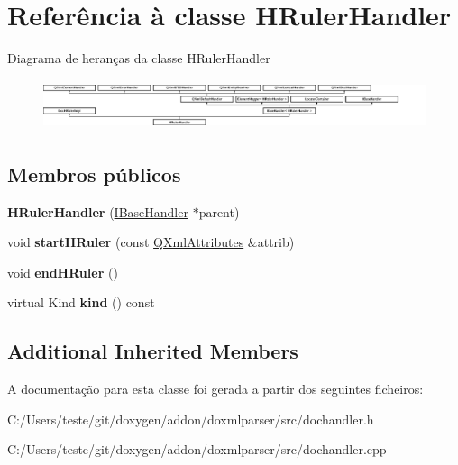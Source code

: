 \hypertarget{class_h_ruler_handler}{\section{Referência à classe H\-Ruler\-Handler}
\label{class_h_ruler_handler}
}
Diagrama de heranças da classe H\-Ruler\-Handler\begin{figure}[H]
\begin{center}
\leavevmode
\includegraphics[height=1.481482cm]{class_h_ruler_handler}
\end{center}
\end{figure}
\subsection*{Membros públicos}
\begin{DoxyCompactItemize}
\item 
\hypertarget{class_h_ruler_handler_aad7f945f51cb73f8cc76ac419ff53a85}{{\bfseries H\-Ruler\-Handler} (\hyperlink{class_i_base_handler}{I\-Base\-Handler} $\ast$parent)}\label{class_h_ruler_handler_aad7f945f51cb73f8cc76ac419ff53a85}

\item 
\hypertarget{class_h_ruler_handler_a732b339fe1cad4aad37026bf49e56139}{void {\bfseries start\-H\-Ruler} (const \hyperlink{class_q_xml_attributes}{Q\-Xml\-Attributes} \&attrib)}\label{class_h_ruler_handler_a732b339fe1cad4aad37026bf49e56139}

\item 
\hypertarget{class_h_ruler_handler_a52e19233aa8c107a9d9f544a392e2339}{void {\bfseries end\-H\-Ruler} ()}\label{class_h_ruler_handler_a52e19233aa8c107a9d9f544a392e2339}

\item 
\hypertarget{class_h_ruler_handler_af8e62c8a81ddf2283205cc8955de50eb}{virtual Kind {\bfseries kind} () const }\label{class_h_ruler_handler_af8e62c8a81ddf2283205cc8955de50eb}

\end{DoxyCompactItemize}
\subsection*{Additional Inherited Members}


A documentação para esta classe foi gerada a partir dos seguintes ficheiros\-:\begin{DoxyCompactItemize}
\item 
C\-:/\-Users/teste/git/doxygen/addon/doxmlparser/src/dochandler.\-h\item 
C\-:/\-Users/teste/git/doxygen/addon/doxmlparser/src/dochandler.\-cpp\end{DoxyCompactItemize}
